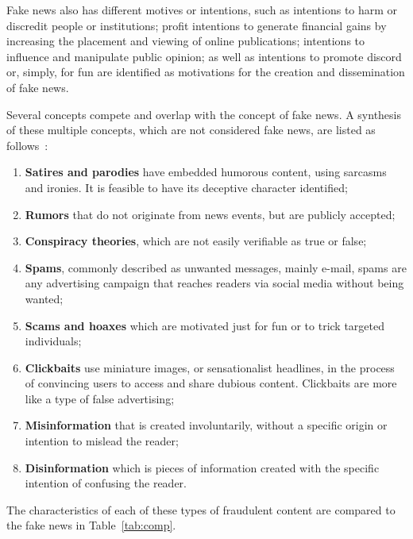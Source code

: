 \documentclass{ieeeaccess}
\begin{document}
Fake news also has different motives or intentions, such as intentions to harm or discredit people or institutions; profit intentions to generate financial gains by increasing the placement and viewing of online publications; intentions to influence and manipulate public opinion; as well as intentions to promote discord or, simply, for fun are identified as motivations for the creation and dissemination of fake news.

Several concepts compete and overlap with the concept of fake news. A synthesis of these multiple concepts, which are not considered fake news, are listed as follows~\cite{rubin2015deception,shu2017fake,zhou2018fake,chen2015misleading}: 

\begin{enumerate}
    \item \textbf{Satires and parodies} have embedded humorous content, using sarcasms and ironies. It is feasible to have its deceptive character identified; 
    \item \textbf{Rumors} that do not originate from news events, but are publicly accepted; 
    \item  \textbf{Conspiracy theories}, which are not easily verifiable as true or false; 
    \item \textbf{Spams}, commonly described as unwanted messages, mainly e-mail, spams are any advertising campaign that reaches readers via social media without being wanted; 
    \item \textbf{Scams and hoaxes} which are motivated just for fun or to trick targeted individuals; 
    \item \textbf{Clickbaits} use miniature images, or sensationalist headlines, in the process of convincing users to access and share dubious content. Clickbaits are more like a type of false advertising;
    \item \textbf{Misinformation} that is created involuntarily, without a specific origin or intention to mislead the reader; 
    \item \textbf{Disinformation} which is pieces of information created with the specific intention of confusing the reader.
\end{enumerate}

\noindent The characteristics of each of these types of fraudulent content are compared to the fake news in Table~\ref{tab:comp}.
\end{document}
